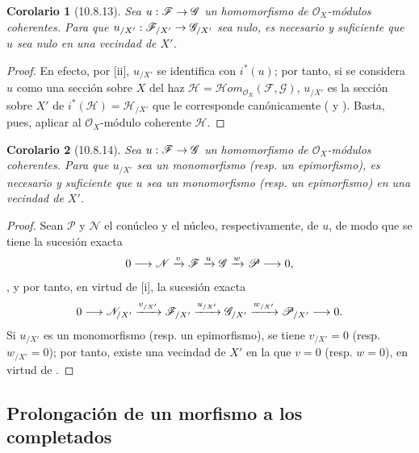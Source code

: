 \documentclass[oneside]{amsart}
\theoremstyle{ega-env-style}
\theoremstyle{ega-thm-env-style}
\newtheorem*{corollary}{Corolario}
\theoremstyle{ega-defn-env-style}
\renewcommand{\to}{\mathchoice{\longrightarrow}{\rightarrow}{\rightarrow}{\rightarrow}}
\let\EGAOriginalLabel\label
\renewcommand{\label}[1]{\phantomsection\EGAOriginalLabel{#1}}
\begin{document}
\begin{corollary}[10.8.13]
\label{I.10.8.13}
Sea $u:\mathscr{F}\to\mathscr{G}$ un homomorfismo de $\mathscr{O}_X$-módulos coherentes.
Para que $u_{/X'}:\mathscr{F}_{/X'}\to\mathscr{G}_{/X'}$ sea nulo, es necesario y suficiente que $u$ sea nulo en una vecindad de $X'$.
\end{corollary}

\begin{proof}
En efecto, por [ii], $u_{/X'}$ se identifica con $i^*(u)$; por tanto, si se considera $u$ como una sección sobre $X$ del haz $\mathscr{H}=\mathscr{H}\!om_{\mathscr{O}_X}(\mathscr{F},\mathscr{G})$, $u_{/X'}$ es la sección sobre $X'$ de $i^*(\mathscr{H})=\mathscr{H}_{/X'}$ que le corresponde canónicamente ( y ).
Basta, pues, aplicar  al $\mathscr{O}_X$-módulo coherente $\mathscr{H}$.
\end{proof}

\begin{corollary}[10.8.14]
\label{I.10.8.14}
Sea $u:\mathscr{F}\to\mathscr{G}$ un homomorfismo de $\mathscr{O}_X$-módulos coherentes.
Para que $u_{/X'}$ sea un monomorfismo \textup{(resp.} un epimorfismo), es necesario y suficiente que $u$ sea un monomorfismo \textup{(resp.} un epimorfismo) en una vecindad de $X'$.
\end{corollary}

\begin{proof}
Sean $\mathscr{P}$ y $\mathscr{N}$ el conúcleo y el núcleo, respectivamente, de $u$, de modo que se tiene la sucesión exacta \[
  0\to\mathscr{N}\xrightarrow{v}\mathscr{F}\xrightarrow{u}
  \mathscr{G}\xrightarrow{w}\mathscr{P}\to0,
\], y por tanto, en virtud de [i], la sucesión exacta
\[
  0\to\mathscr{N}_{/X'}\xrightarrow{v_{/X'}}
  \mathscr{F}_{/X'}\xrightarrow{u_{/X'}}
  \mathscr{G}_{/X'}\xrightarrow{w_{/X'}}
  \mathscr{P}_{/X'}\to0.
\]
Si $u_{/X'}$ es un monomorfismo (resp. un epimorfismo), se tiene $v_{/X'}=0$ (resp. $w_{/X'}=0$); por tanto, existe una vecindad de $X'$ en la que $v=0$ (resp. $w=0$), en virtud de .
\end{proof}

\subsection{Prolongación de un morfismo a los completados}
\label{subsection:I.10.9}
\end{document}
